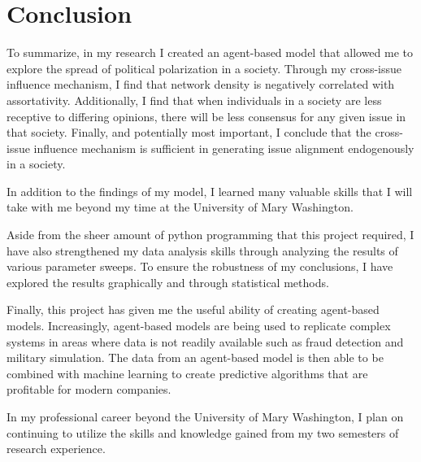 \section{Conclusion}

To summarize, in my research I created an agent-based model that allowed me to explore the spread of political polarization in a society. Through my cross-issue influence mechanism, I find that network density is negatively correlated with assortativity. Additionally, I find that when individuals in a society are less receptive to differing opinions, there will be less consensus for any given issue in that society. Finally, and potentially most important, I conclude that the cross-issue influence mechanism is sufficient in generating issue alignment endogenously in a society. 

In addition to the findings of my model, I learned many valuable skills that I will take with me beyond my time at the University of Mary Washington. 

Aside from the sheer amount of python programming that this project required, I have also strengthened my data analysis skills through analyzing the results of various parameter sweeps. To ensure the robustness of my conclusions, I have explored the results graphically and through statistical methods. 

Finally, this project has given me the useful ability of creating agent-based models. Increasingly, agent-based models are being used to replicate complex systems in areas where data is not readily available such as fraud detection and military simulation. The data from an agent-based model is then able to be combined with machine learning to create predictive algorithms that are profitable for modern companies. 

In my professional career beyond the University of Mary Washington, I plan on continuing to utilize the skills and knowledge gained from my two semesters of research experience.   